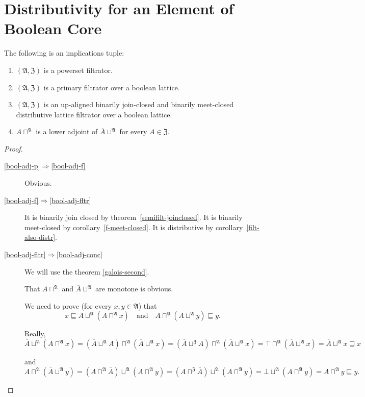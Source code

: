 \section{Distributivity for an Element of Boolean Core}
\begin{lem}
\label{bb-bool-adj}The following is an implications tuple:
\begin{enumerate}
\item \label{bool-adj-p}$(\mathfrak{A},\mathfrak{Z})$ is a powerset filtrator.
\item \label{bool-adj-f}$(\mathfrak{A},\mathfrak{Z})$ is a primary filtrator
over a boolean lattice.
\item \label{bool-adj-fltr}$(\mathfrak{A},\mathfrak{Z})$ is an up-aligned
binarily join-closed and binarily meet-closed distributive lattice
filtrator over a boolean lattice.
\item \label{bool-adj-conc}$A\sqcap^{\mathfrak{A}}$ is a lower adjoint
of $\overline{A}\sqcup^{\mathfrak{A}}$ for every $A\in\mathfrak{Z}$.
\end{enumerate}
\end{lem}
\begin{proof}
~
\begin{description}
\item [{\ref{bool-adj-p}$\Rightarrow$\ref{bool-adj-f}}] Obvious.
\item [{\ref{bool-adj-f}$\Rightarrow$\ref{bool-adj-fltr}}] It is binarily join closed by theorem~\ref{semifilt-joinclosed}.
It is binarily meet-closed by corollary~\ref{f-meet-closed}. It is distributive by
corollary~\ref{filt-also-distr}.
\item [{\ref{bool-adj-fltr}$\Rightarrow$\ref{bool-adj-conc}}] We will
use the theorem \ref{galois-second}.


That $A\sqcap^{\mathfrak{A}}$ and $\overline{A}\sqcup^{\mathfrak{A}}$
are monotone is obvious.


We need to prove (for every $x,y\in\mathfrak{A}$) that
\[
x\sqsubseteq\overline{A}\sqcup^{\mathfrak{A}}(A\sqcap^{\mathfrak{A}}x)\quad\text{and}\quad A\sqcap^{\mathfrak{A}}(\overline{A}\sqcup^{\mathfrak{A}}y)\sqsubseteq y.
\]



Really,
\[
\overline{A}\sqcup^{\mathfrak{A}}(A\sqcap^{\mathfrak{A}}x)=(\overline{A}\sqcup^{\mathfrak{A}}A)\sqcap^{\mathfrak{A}}(\overline{A}\sqcup^{\mathfrak{A}}x)=(\overline{A}\sqcup^{\mathfrak{Z}}A)\sqcap^{\mathfrak{A}}(\overline{A}\sqcup^{\mathfrak{A}}x)=\top\sqcap^{\mathfrak{A}}(\overline{A}\sqcup^{\mathfrak{A}}x)=\overline{A}\sqcup^{\mathfrak{A}}x\sqsupseteq x
\]



and
\[
A\sqcap^{\mathfrak{A}}(\overline{A}\sqcup^{\mathfrak{A}}y)=(A\sqcap^{\mathfrak{A}}\overline{A})\sqcup^{\mathfrak{A}}(A\sqcap^{\mathfrak{A}}y)=(A\sqcap^{\mathfrak{Z}}\overline{A})\sqcup^{\mathfrak{A}}(A\sqcap^{\mathfrak{A}}y)=\bot\sqcup^{\mathfrak{A}}(A\sqcap^{\mathfrak{A}}y)=A\sqcap^{\mathfrak{A}}y\sqsubseteq y.
\]


\end{description}
\end{proof}
